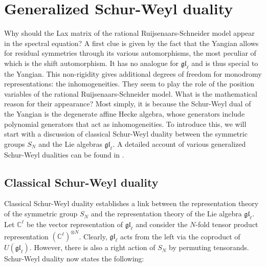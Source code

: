 \documentclass[11pt]{report}
\newtheorem{corollary}[theorem]{Corollary}
\theoremstyle{definition}
\theoremstyle{remark}
\theoremstyle{remark}
\newcommand{\C}{\mathbb{C}}
\begin{document}
%
%

\section{Generalized Schur-Weyl duality}

Why should the Lax matrix of the rational Ruijsenaars-Schneider model appear in the spectral equation? A first clue is given by the fact that the Yangian allows for residual symmetries through its various automorphisms, the most peculiar of which is the shift automorphism. It has no analogue for $\mathfrak{gl}_\ell$ and is thus special to the Yangian. This non-rigidity gives additional degrees of freedom for monodromy representations: the inhomogeneities. They seem to play the role of the position variables of the rational Ruijsenaars-Schneider model. What is the mathematical reason for their appearance? Most simply, it is because the Schur-Weyl dual of the Yangian is the degenerate affine Hecke algebra, whose generators include polynomial generators that act as inhomogeneities. To introduce this, we will start with a discussion of classical Schur-Weyl duality between the symmetric groups $S_N$ and the Lie algebras $\mathfrak{gl}_\ell$. A detailed account of various generalized Schur-Weyl dualities can be found in \cite{thesis:antor:2020}.

\subsection{Classical Schur-Weyl duality}

Classical Schur-Weyl duality establishes a link between the representation theory of the symmetric group $S_N$ and the representation theory of the Lie algebra $\mathfrak{gl}_\ell$. Let $\C^\ell$ be the vector representation of $\mathfrak{gl}_\ell$ and consider the $N$-fold tensor product representation $(\C^\ell)^{\otimes N}$. Clearly, $\mathfrak{gl}_\ell$ acts from the left via the coproduct of $U(\mathfrak{gl}_\ell)$. However, there is also a right action of $S_N$ by permuting tensorands. Schur-Weyl duality now states the following:
\end{document}

